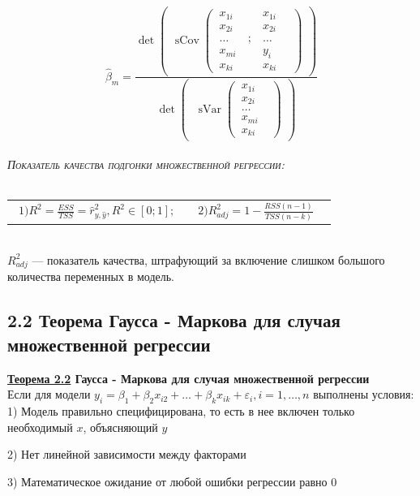 \documentclass[a0,final]{a0poster}
\DeclareMathOperator{\sVar}{sVar}
\DeclareMathOperator{\sCov}{sCov}
\DeclareMathOperator{\E}{E}
\begin{document}
\begin{multicols}{4}
\[\hat{\beta}_m = \frac{\det{\begin{pmatrix}
\sCov{\begin{pmatrix}
  \ x_{1i}& \ & \ x_{1i}&\\
  \ x_{2i}& \ & \ x_{2i}&\\
  \ \ldots& \ ;& \ \ldots&\\
  \ x_{mi}& \ &\ y_i&\\
  \ x_{ki}&\ & \ x_{ki}\
  \end{pmatrix}}\end{pmatrix}}}{\det{\begin{pmatrix}
\ \sVar{\begin{pmatrix}
  \ x_{1i}& \\
  \ x_{2i}& \\
  \ \ldots& \\
  \ x_{mi}& \\
  \ x_{ki}&
  \end{pmatrix}}\end{pmatrix}}}\]
\\
\textsc{\textit{Показатель качества подгонки множественной регрессии:}} \\
\\
\begin{tabular}{r  l}\
$ 1) R^2 = \frac{ESS}{TSS} = \hat{r}^2_{y,\hat{y}}, R^2 \in [0;1]; \qquad 2) R^2_{adj} = 1 - \frac{RSS(n-1)}{TSS(n-k)}$
\end{tabular}
\\
$R^2_{adj}$ — показатель качества, штрафующий за включение слишком большого количества переменных в модель.

\subsection*{\textbf{2.2 Теорема Гаусса - Маркова для случая множественной регрессии}}
\begin{tcolorbox}[colback=red!5!white,colframe=red!75!black]
\textbf{\underline{Теорема 2.2} Гаусса - Маркова для случая множественной регрессии}\\
Если для модели $y_i={\beta}_1 +{\beta}_2x_{i2} + \ldots + \beta_kx_{ik} + {\varepsilon}_i, i = 1, \ldots,n$ выполнены условия: \\
1) Модель правильно специфицирована, то есть в нее включен только необходимый $x$, объясняющий $y$

2) Нет линейной зависимости между факторами

3) %
Математическое ожидание от любой ошибки регрессии равно 0


\end{tcolorbox}
\end{multicols}
\end{document}
